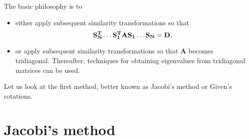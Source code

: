 The basic philosophy is to
%
\begin{itemize}
%
\item either apply subsequent similarity transformations so that 
%
\begin{equation}
   {\bf S_N^T\dots S_1^TAS_1\dots S_N }={\bf D} ,
\end{equation}
%
\item  or apply subsequent similarity transformations so that 
 {\bf A} becomes tridiagonal. Thereafter, techniques for obtaining
eigenvalues from tridiagonal matrices can be used.
\end{itemize}
Let us look at the first method, better known as Jacobi's method or Given's rotations.

\section{Jacobi's method}

